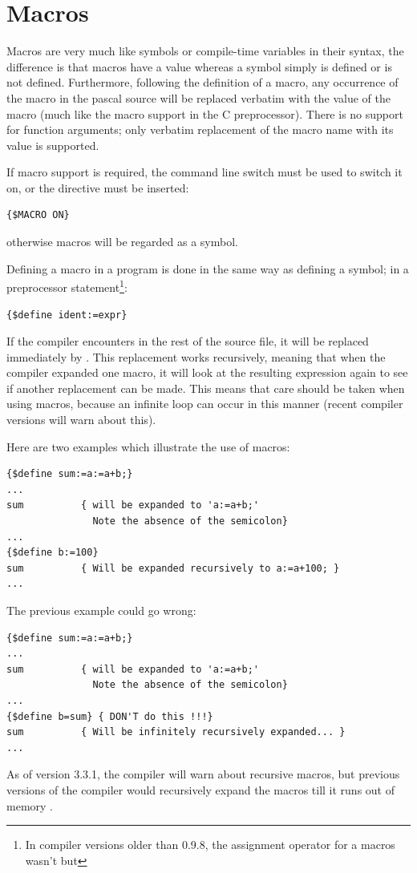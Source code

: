 \section{Macros}
\label{se:Macros}
Macros are very much like symbols or compile-time variables in their syntax, 
the difference is that macros have a value whereas a symbol simply is defined 
or is not defined. Furthermore, following the definition of a macro, any
occurrence of the macro in the pascal source will be replaced verbatim with the value
of the macro (much like the macro support in the C preprocessor). There is
no support for function arguments; only verbatim replacement of the macro
name with its value is supported.

If macro support is required, the  command line switch must be used to
switch it on, or the directive must be inserted:
\begin{verbatim}
{$MACRO ON}
\end{verbatim}
otherwise macros will be regarded as a symbol.

Defining a macro in a program is done in the same way as defining a symbol;
in a  preprocessor statement\footnote{In compiler
versions older than 0.9.8, the assignment operator for a macros wasn't
\var{:=} but \var{=}}:
\begin{verbatim}
{$define ident:=expr}
\end{verbatim}
If the compiler encounters  in the rest of the source file, it
will be replaced immediately by . This replacement works
recursively, meaning that when the compiler expanded one macro, it
will look at the resulting expression again to see if another replacement
can be made. This means that care should be taken when using macros, 
because an infinite loop can occur in this manner (recent compiler 
versions will warn about this).

Here are two examples which illustrate the use of macros:
\begin{verbatim}
{$define sum:=a:=a+b;}
...
sum          { will be expanded to 'a:=a+b;'
               Note the absence of the semicolon}
...
{$define b:=100}
sum          { Will be expanded recursively to a:=a+100; }
...
\end{verbatim}
The previous example could go wrong:
\begin{verbatim}
{$define sum:=a:=a+b;}
...
sum          { will be expanded to 'a:=a+b;'
               Note the absence of the semicolon}
...
{$define b=sum} { DON'T do this !!!}
sum          { Will be infinitely recursively expanded... }
...
\end{verbatim}
As of version 3.3.1, the compiler will warn about recursive macros, but
previous versions of the compiler would recursively expand the macros till
it runs out of memory .

